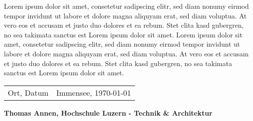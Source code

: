 \begin{flushleft}
Lorem ipsum dolor sit amet, consetetur sadipscing elitr, sed diam nonumy eirmod tempor invidunt ut labore et dolore magna aliquyam erat, sed diam voluptua. At vero eos et accusam et justo duo dolores et ea rebum. Stet clita kasd gubergren, no sea takimata sanctus est Lorem ipsum dolor sit amet. Lorem ipsum dolor sit amet, consetetur sadipscing elitr, sed diam nonumy eirmod tempor invidunt ut labore et dolore magna aliquyam erat, sed diam voluptua. At vero eos et accusam et justo duo dolores et ea rebum. Stet clita kasd gubergren, no sea takimata sanctus est Lorem ipsum dolor sit amet.\\
\end{flushleft}
\begin{table}[h!]
\begin{tabularx}{\textwidth}{lX}
Ort, Datum & Immensee, \today
\end{tabularx}
\end{table}
\textbf{\textsuperscript{\textcopyright}Thomas Annen, Hochschule Luzern - Technik \& Architektur}
\pagebreak
